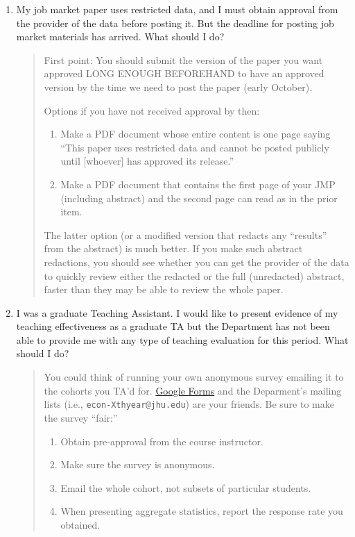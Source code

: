 \documentclass{\classes/econtex}
\begin{document}
\begin{enumerate}
\begin{quote}
    \hypertarget{restricted-data}{}  
  \end{quote}

\item  My job market paper uses restricted data, and I must obtain approval from the provider of the data before posting it. But the deadline for posting job market materials has arrived. What should I do?

  \begin{quote}
    First point: You should submit the version of the paper you want approved LONG ENOUGH BEFOREHAND to have an approved version by the time we need to post the paper (early October).

    Options if you have not received approval by then:
    \begin{enumerate}
    \item Make a PDF document whose entire content is one page saying ``This paper uses restricted data and cannot be posted publicly until [whoever] has approved its release.''
    \item Make a PDF document that contains the first page of your JMP (including abstract) and the second page can read as in the prior item.
    \end{enumerate}

    The latter option (or a modified version that redacts any ``results'' from the abstract) is much better. If you make such abstract redactions, you should see whether you can get the provider of the data to quickly review either the redacted or the full (unredacted) abstract, faster than they may be able to review the whole paper.

  \end{quote}

\item I was a graduate Teaching Assistant. I would like to present evidence of my teaching effectiveness as a graduate TA but the Department has not been able to provide me with any type of teaching evaluation for this period. What should I do?

\begin{quote}
	You could think of running your own anonymous survey emailing it to the cohorts you TA'd for. \href{https://docs.google.com/forms/}{Google Forms} and the Deparment's mailing lists (i.e., \texttt{econ-Xthyear@jhu.edu}) are your friends. Be sure to make the survey ``fair:''
	\begin{enumerate}
		\item Obtain pre-approval from the course instructor.
		\item Make sure the survey is anonymous.
		\item Email the whole cohort, not subsets of particular students.
		\item When presenting aggregate statistics, report the response rate you obtained.
	\end{enumerate}
\end{quote}


\end{enumerate}
\end{document}
